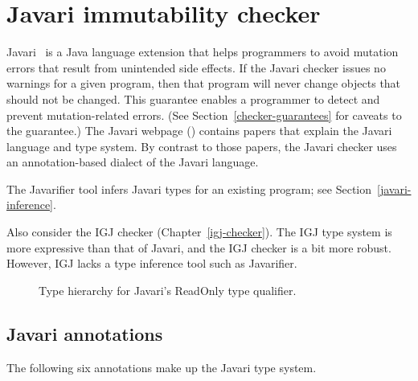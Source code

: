 \htmlhr
\chapter{Javari immutability checker\label{javari-checker}}

Javari~\cite{TschantzE2005,QuinonezTE2008} is a Java language extension that helps programmers to avoid mutation
errors that result from unintended side effects.
If the Javari checker issues no warnings for a given program, then that
program will never change objects that should not be changed.  This
guarantee enables a programmer to detect and prevent mutation-related
errors.  (See Section~\ref{checker-guarantees} for caveats to the guarantee.)
The Javari webpage () contains
papers that explain the Javari language and type system.
By contrast to those papers, the Javari checker uses an annotation-based
dialect of the Javari language.

The Javarifier tool infers Javari types for an existing program; see
Section~\ref{javari-inference}.

Also consider the IGJ checker (Chapter~\ref{igj-checker}).  The IGJ type
system is more expressive than that of Javari, and the IGJ checker is a bit
more robust.  However, IGJ lacks a type inference tool such as Javarifier.



\begin{figure}
\caption{Type hierarchy for Javari's ReadOnly type qualifier.}
\label{fig:javari-hierarchy}
\end{figure}


\section{Javari annotations\label{javary-annotations}}

The following six annotations make up the Javari type system.

